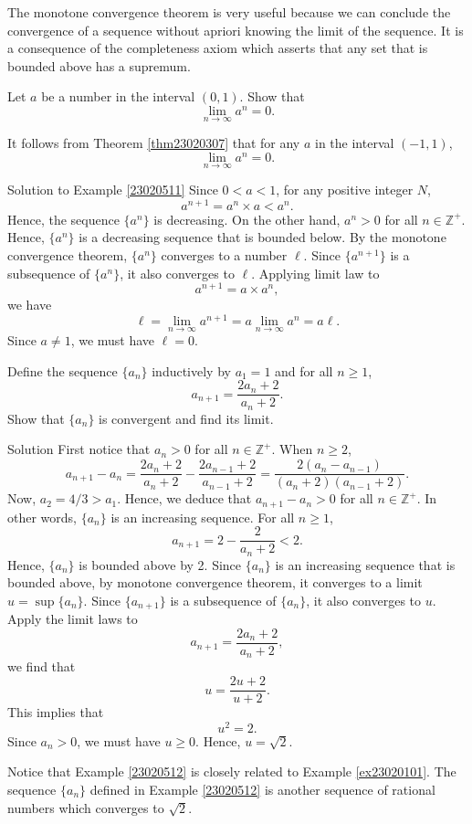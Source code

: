 The monotone convergence theorem is very useful because we can conclude the convergence of a sequence without apriori knowing  the limit of the sequence.  It is a consequence of the completeness axiom which asserts that any set that is bounded above has a supremum.  

\begin{example}[label=23020511]{}Let $a$ be a number in the interval $(0,1)$. Show that
\[\lim_{n\rightarrow\infty}a^n=0.\]

\end{example}

\begin{remark}{}

It follows from Theorem \ref{thm23020307} that for any $a$ in the interval $(-1,1)$, 
\[\lim_{n\rightarrow\infty}a^n=0.\]
\end{remark}

\begin{solution}{\linkt Solution to Example \ref{23020511}\linko}
Since $0<a<1$, for any positive integer $N$,
\[a^{n+1}=a^n\times a<a^n.\]
Hence, the sequence $\{a^n\}$ is decreasing.  On the other hand, $a^n>0$ for all $n\in\mathbb{Z}^+$. Hence, $\{a^n\}$ is a   decreasing sequence that is bounded below. By the monotone convergence theorem, $\{a^n\}$ converges to a number $\ell$. 
\bs
Since $\{a^{n+1}\}$ is a subsequence of $\{a^n\}$, it also converges to $\ell$.
Applying limit law to 
\[a^{n+1}=a\times a^n,\]
we have
\[\ell=\lim_{n\rightarrow\infty}a^{n+1}=a\lim_{n\rightarrow\infty}a^n=a\ell.\]
Since $a\neq 1$, we must have $\ell=0$.
\end{solution}

\begin{example}[label=23020512]{}
Define the sequence $\{a_n\}$ inductively by $a_1=1$ and for all $n\geq 1$,
\[a_{n+1}=\frac{2a_n+2}{a_n+2}.\]
Show that $\{a_{n}\}$ is convergent and find its limit.
\end{example}

\begin{solution}
{Solution} 
First notice that $a_n>0$ for all $n\in\mathbb{Z}^+$. 
When $n\geq 2$,
\[
a_{n+1}-a_n =\frac{2a_n+2}{a_n+2}-\frac{2a_{n-1}+2}{a_{n-1}+2}
 =\frac{2(a_n-a_{n-1})}{(a_n+2)(a_{n-1}+2)}.
\] Now, $a_2=4/3>a_1$. Hence, we deduce that $a_{n+1}-a_n>0$ for all $n\in\mathbb{Z}^+$.  In other words, $\{a_{n}\}$ is an increasing sequence.
 For all $n\geq 1$,
\[a_{n+1}=2-\frac{2}{a_n+2}<2.\]
Hence, $\{a_n\}$ is bounded above by 2.
Since $\{a_n\}$ is an increasing sequence that is bounded above, by monotone convergence theorem, it converges to a limit $u=\sup\{a_n\}$. 
Since $\{a_{n+1}\}$ is a subsequence of $\{a_n\}$,  it also converges to $u$. Apply the limit laws to \[a_{n+1}=\frac{2a_n+2}{a_n+2},\]we find that
\[u=\frac{2u+2}{u+2}.\]\bs
This implies that 
\[u^2=2.\]
Since $a_n>0$, we must have $u\geq 0$.  Hence, $u=\sqrt{2}$.

\end{solution}
Notice that Example \ref{23020512} is closely related to Example \ref{ex23020101}. The sequence $\{a_n\}$ defined in Example \ref{23020512}  is another sequence of rational numbers which converges to $\sqrt{2}$.


